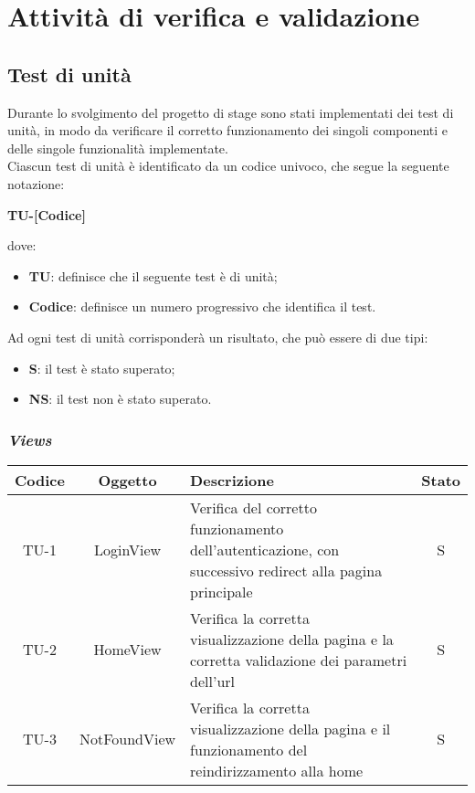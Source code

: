 \chapter{Attività di verifica e validazione}
\label{cap:verifica-validazione}


\section{Test di unità}
Durante lo svolgimento del progetto di stage sono stati implementati dei test di unità, in modo da verificare il corretto funzionamento
dei singoli componenti e delle singole funzionalità implementate.\\
Ciascun test di unità è identificato da un codice univoco, che segue la seguente notazione:
\begin{center}
  \textbf{TU-[Codice]}
\end{center}
dove:
\begin{itemize}
  \item \textbf{TU}: definisce che il seguente test è di unità;
  \item \textbf{Codice}: definisce un numero progressivo che identifica il test.
\end{itemize}
Ad ogni test di unità corrisponderà un risultato, che può essere di due tipi:
\begin{itemize}
  \item \textbf{S}: il test è stato superato;
  \item \textbf{NS}: il test non è stato superato.
\end{itemize}

\clearpage
\subsection*{\emph{Views}}

\begin{center}
  \label{tab:test-unita-views}
  \begin{longtable}{|c|c|p{}|c|}
  \hline
  \textbf{Codice} & \textbf{Oggetto} & \textbf{Descrizione} & \textbf{Stato}\\
  \hline
  TU-1 &LoginView &Verifica del corretto funzionamento dell'autenticazione, con successivo redirect alla pagina principale &S \\
  \hline
  TU-2 &HomeView &Verifica la corretta visualizzazione della pagina e la corretta validazione dei parametri dell'url &S \\
  \hline
  TU-3 &NotFoundView &Verifica la corretta visualizzazione della pagina e il funzionamento del reindirizzamento alla home &S \\
  \hline
\end{longtable}
\end{center}

